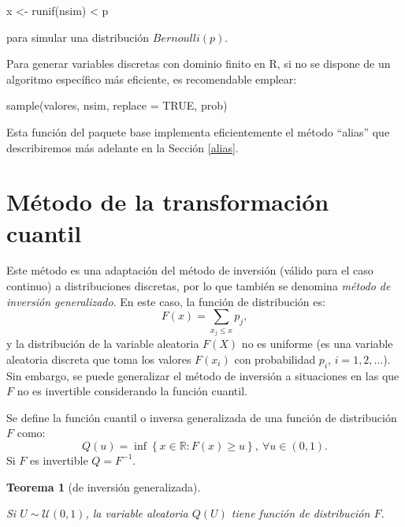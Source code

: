 \documentclass[
]{book}
\newenvironment{Shaded}{\begin{snugshade}}{\end{snugshade}}
\newcommand{\AttributeTok}[1]{\textcolor[rgb]{0.77,0.63,0.00}{#1}}
\newcommand{\ConstantTok}[1]{\textcolor[rgb]{0.00,0.00,0.00}{#1}}
\newcommand{\FunctionTok}[1]{\textcolor[rgb]{0.00,0.00,0.00}{#1}}
\newcommand{\NormalTok}[1]{#1}
\newcommand{\OtherTok}[1]{\textcolor[rgb]{0.56,0.35,0.01}{#1}}
\newcommand{\SpecialCharTok}[1]{\textcolor[rgb]{0.00,0.00,0.00}{#1}}
\theoremstyle{break}
\newtheorem{theorem}{Teorema}[chapter]
\theoremstyle{nonumberplain}
\begin{document}
\begin{Shaded}
\begin{Highlighting}[]
\NormalTok{x }\OtherTok{\textless{}{-}} \FunctionTok{runif}\NormalTok{(nsim) }\SpecialCharTok{\textless{}}\NormalTok{ p}
\end{Highlighting}
\end{Shaded}

para simular una distribución \(Bernoulli(p)\).

Para generar variables discretas con dominio finito en R,
si no se dispone de un algoritmo específico más eficiente,
es recomendable emplear:

\begin{Shaded}
\begin{Highlighting}[]
\FunctionTok{sample}\NormalTok{(valores, nsim, }\AttributeTok{replace =} \ConstantTok{TRUE}\NormalTok{, prob)}
\end{Highlighting}
\end{Shaded}

Esta función del paquete base implementa eficientemente el método ``alias''
que describiremos más adelante en la Sección \ref{alias}.

\hypertarget{transcuant}{%
\section{Método de la transformación cuantil}\label{transcuant}}

Este método es una adaptación del método de inversión (válido para el caso continuo) a distribuciones discretas, por lo que también se denomina \emph{método de inversión generalizado}.
En este caso, la función de distribución es:
\[F\left( x\right)  =\sum_{x_{j}\leq x}p_{j},\]
y la distribución de la variable aleatoria \(F\left( X\right)\) no es uniforme (es una variable aleatoria discreta que toma los valores \(F\left( x_{i} \right)\) con probabilidad \(p_{i}\), \(i=1,2,\ldots\)).
Sin embargo, se puede generalizar el método de inversión a situaciones en las que \(F\) no es invertible considerando la función cuantil.

Se define la función cuantil o inversa generalizada de una función de distribución \(F\) como:
\[Q\left( u\right) =\inf \left\{ x\in \mathbb{R}:F\left( x\right) \geq
u\right\} ,\ \forall u\in \left( 0,1\right).\]
Si \(F\) es invertible \(Q=F^{-1}\).

\begin{theorem}[de inversión generalizada]
\protect\hypertarget{thm:invgen}{}\label{thm:invgen}

Si \(U\sim \mathcal{U}\left( 0,1\right)\), la variable aleatoria \(Q\left( U\right)\) tiene función de distribución \(F\).
\end{theorem}
\end{document}
